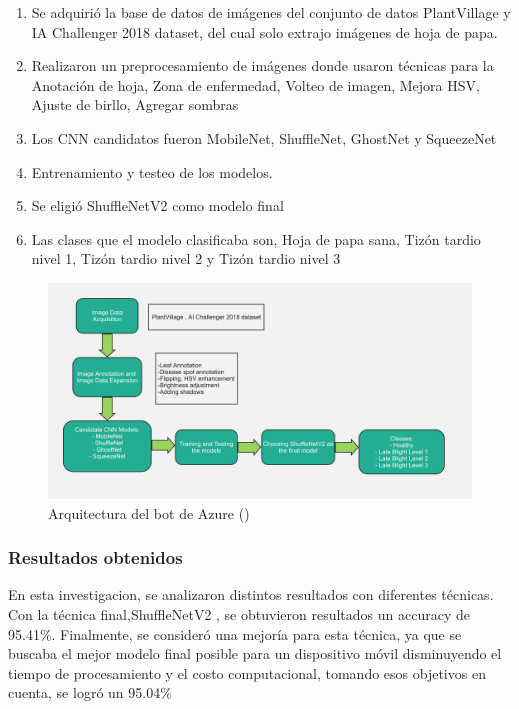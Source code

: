 \begin{enumerate}
	\item Se adquirió la base de datos de imágenes del conjunto de datos PlantVillage y IA Challenger 2018 dataset, del cual solo extrajo imágenes de hoja de papa.
	\item Realizaron un preprocesamiento de imágenes donde usaron técnicas para la Anotación de hoja, Zona de enfermedad, Volteo de imagen, Mejora HSV, Ajuste de birllo, Agregar sombras
	\item Los CNN candidatos fueron  MobileNet, ShuffleNet, GhostNet y SqueezeNet
	\item Entrenamiento y testeo de los modelos.
	\item Se eligió ShuffleNetV2 como modelo final
	\item Las clases que el modelo clasificaba son, Hoja de papa sana, Tizón tardio nivel 1, Tizón tardio nivel 2 y Tizón tardio nivel 3
\end{enumerate}
\begin{figure}[H]
	\begin{center}
		\includegraphics[width=1\textwidth]{2/figures/ant2.2.jpg}
		\caption{Arquitectura del bot de Azure (\cite{antecedente2})}
	\end{center}
\end{figure}


\subsubsection{Resultados obtenidos}
En esta investigacion, se analizaron distintos resultados con diferentes técnicas. Con la técnica final,ShuffleNetV2 , se obtuvieron resultados un accuracy de 95.41\%. Finalmente, se consideró una mejoría para esta técnica, ya que se buscaba el mejor modelo final posible para un dispositivo móvil disminuyendo el tiempo de procesamiento y el costo computacional, tomando esos objetivos en cuenta, se logró un 95.04\%

